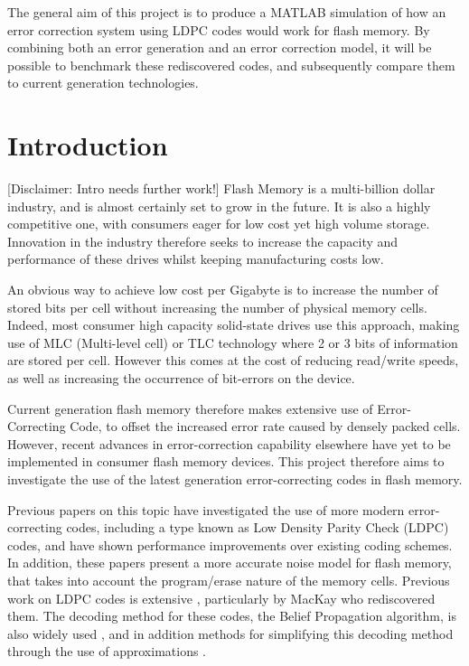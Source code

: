 \documentclass[11pt]{article}
\numberwithin{equation}{subsection}
\begin{document}
The general aim of this project is to produce a MATLAB simulation of how an error correction system using LDPC codes would work for flash memory.  By combining both an error generation and an error correction model, it will be possible to benchmark these rediscovered codes, and subsequently compare them to current generation technologies.

\tableofcontents

\section{Introduction}
[Disclaimer: Intro needs further work!] Flash Memory is a multi-billion dollar industry, and is almost certainly set to grow in the future. It is also a highly competitive one, with consumers eager for low cost yet high volume storage. Innovation in the industry therefore seeks to increase the capacity and performance of these drives whilst keeping manufacturing costs low. 

An obvious way to achieve low cost per Gigabyte is to increase the number of stored bits per cell without increasing the number of physical memory cells. Indeed, most consumer high capacity solid-state drives use this approach, making use of MLC (Multi-level cell) or TLC technology where 2 or 3 bits of information are stored per cell. However this comes at the cost of reducing read/write speeds, as well as increasing the occurrence of bit-errors on the device. 

Current generation flash memory therefore makes extensive use of Error-Correcting Code, to offset the increased error rate caused by densely packed cells. However, recent advances in error-correction capability elsewhere have yet to be implemented in consumer flash memory devices. This project therefore aims to investigate the use of the latest generation error-correcting codes in flash memory. 

Previous papers \cite{dong2012estimating,DBLP:journals/corr/abs-1210-0149} on this topic have investigated the use of more modern error-correcting codes, including a type known as Low Density Parity Check (LDPC) codes, and have shown performance improvements over existing coding schemes. In addition, these papers present a more accurate noise model for flash memory, that takes into account the program/erase nature of the memory cells. Previous work on LDPC codes is extensive \cite{mncisit,gallager1962low}, particularly by MacKay who rediscovered them. The decoding method for these codes, the Belief Propagation algorithm, is also widely used \cite{davey1998low,chen2002near}, and in addition methods for simplifying this decoding method through the use of approximations \cite{zhao2005implementation,chen2005reduced,islam2011optimized}.
\end{document}
